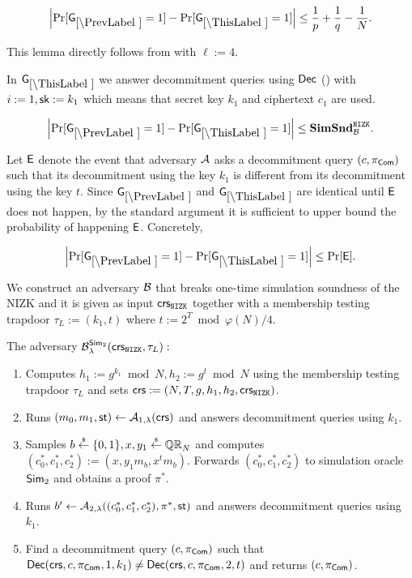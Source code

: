 \begin{lemma}
\[
\left|\Pr[\games_\prevgame = 1] - \Pr[\games_\thisgame = 1]\right| \leq \frac{1}{p}+\frac{1}{q}-\frac{1}{N}.
\]
\end{lemma}

This lemma directly follows from  with $\ell:=4$.



In $\games_\thisgame$ we answer decommitment queries using $\mathsf{Dec}$ () with $i:=1, \mathsf{sk}:=k_1$ which means that secret key $k_1$ and ciphertext $c_1$ are used. 

\begin{lemma}
\[
\left|\Pr[\games_\prevgame = 1] - \Pr[\games_\thisgame = 1]\right| \leq \simsnd^\nizk_\advB. 
\]
\end{lemma}

Let $\mathsf{E}$ denote the event that adversary $\mathcal{A}$ asks a decommitment query $(c, \pi_{\mathsf{Com}})$ such that its decommitment using the key $k_1$ is different from its decommitment using the key $t$. Since $\games_\prevgame$ and $\games_\thisgame$ are identical until $\mathsf{E}$ does not happen, by the standard argument it is sufficient to upper bound the probability of happening $\mathsf{E}$. Concretely,  

\[
\left|\Pr[\games_\prevgame = 1] - \Pr[\games_\thisgame = 1]\right| \leq \Pr[\event]. 
\]

We construct an adversary $\mathcal{B}$ that breaks one-time simulation soundness of the NIZK and it is given as input $\mathsf{crs}_{\mathtt{NIZK}}$ together with a membership testing trapdoor $\tau_L:=(k_1, t)$ where $t:=2^T \bmod \varphi(N)/4$. 

The adversary $\mathcal{B}_{\lambda}^{\mathsf{Sim}_2}(\mathsf{crs}_{\mathtt{NIZK}}, \tau_L):$
\vspace{-2mm}
\begin{enumerate}
\item Computes $h_1:= g^{k_1} \bmod N, h_2:= g^{t} \bmod N$ using the membership testing trapdoor $\tau_L$ and sets $\mathsf{crs}:=(N, T, g, h_1, h_2, \mathsf{crs}_{\mathtt{NIZK}})$.
\item Runs $(m_0, m_1, \mathsf{st}) \leftarrow \mathcal{A}_{1, \lambda}(\mathsf{crs})$ and answers decommitment queries using $k_1$.
\item Samples $b \stackrel{{\scriptscriptstyle\$}}{\leftarrow} \{0,1\}, x, y_1\stackrel{{\scriptscriptstyle\$}}{\leftarrow} \mathbb{QR}_N$ and computes $(c_0^*, c_1^*, c_2^*):=(x, y_1 m_b,\allowbreak x^t m_b)$. Forwards $(c_0^*, c_1^*, c_2^*)$ to simulation oracle $\mathsf{Sim}_2$ and obtains a proof $\pi^*$.
\item Runs $b' \leftarrow \mathcal{A}_{2, \lambda}((c_0^*, c_1^*, c_2^*), \pi^*, \mathsf{st})$ and answers decommitment queries using $k_1$.
\item Find a decommitment query $(c, \pi_{\mathsf{Com}})$ such that $\mathsf{Dec}(\mathsf{crs}, c, \pi_{\mathsf{Com}}, 1, k_1) \neq \mathsf{Dec}(\mathsf{crs},c, \pi_{\mathsf{Com}}, 2, t)$ and returns $(c, \pi_{\mathsf{Com}})$.
\end{enumerate}

